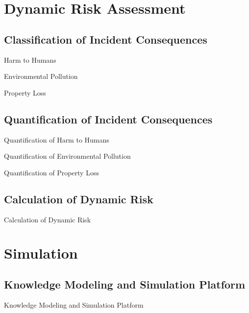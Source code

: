 \documentclass[10pt, compress]{beamer}
\begin{document}
\section{Dynamic Risk Assessment}
\subsection{Classification of Incident Consequences}
\begin{frame}{Harm to Humans}
\end{frame}

\begin{frame}{Environmental Pollution}
\end{frame}

\begin{frame}{Property Loss}
\end{frame}

\subsection{Quantification of Incident Consequences}
\begin{frame}{Quantification of Harm to Humans}
\end{frame}

\begin{frame}{Quantification of Environmental Pollution}
\end{frame}

\begin{frame}{Quantification of Property Loss}
\end{frame}

\subsection{Calculation of Dynamic Risk}
\begin{frame}{Calculation of Dynamic Risk}
\end{frame}

\section{Simulation}
\subsection{Knowledge Modeling and Simulation Platform}
\begin{frame}{Knowledge Modeling and Simulation Platform}
\end{frame}
\end{document}

